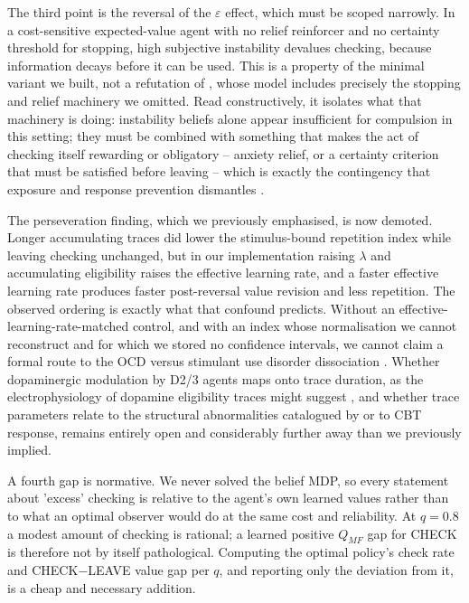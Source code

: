 \documentclass[11pt,a4paper]{article}
\begin{document}
The third point is the reversal of the $\varepsilon$ effect, which must be scoped narrowly. In a cost-sensitive expected-value agent with no relief reinforcer and no certainty threshold for stopping, high subjective instability devalues checking, because information decays before it can be used. This is a property of the minimal variant we built, not a refutation of \citet{fradkin2020searching}, whose model includes precisely the stopping and relief machinery we omitted. Read constructively, it isolates what that machinery is doing: instability beliefs alone appear insufficient for compulsion in this setting; they must be combined with something that makes the act of checking itself rewarding or obligatory -- anxiety relief, or a certainty criterion that must be satisfied before leaving -- which is exactly the contingency that exposure and response prevention dismantles \citep{clark2003cognitivebehavioral}.

The perseveration finding, which we previously emphasised, is now demoted. Longer accumulating traces did lower the stimulus-bound repetition index while leaving checking unchanged, but in our implementation raising $\lambda$ and accumulating eligibility raises the effective learning rate, and a faster effective learning rate produces faster post-reversal value revision and less repetition. The observed ordering is exactly what that confound predicts. Without an effective-learning-rate-matched control, and with an index whose normalisation we cannot reconstruct and for which we stored no confidence intervals, we cannot claim a formal route to the OCD versus stimulant use disorder dissociation \citep{kanen2019computational}. Whether dopaminergic modulation by D2/3 agents maps onto trace duration, as the electrophysiology of dopamine eligibility traces might suggest \citep{pan2005dopamine}, and whether trace parameters relate to the structural abnormalities catalogued by \citet{radua2009voxelwise} or to CBT response, remains entirely open and considerably further away than we previously implied.

A fourth gap is normative. We never solved the belief MDP, so every statement about 'excess' checking is relative to the agent's own learned values rather than to what an optimal observer would do at the same cost and reliability. At $q=0.8$ a modest amount of checking is rational; a learned positive $Q_{MF}$ gap for CHECK is therefore not by itself pathological. Computing the optimal policy's check rate and CHECK$-$LEAVE value gap per $q$, and reporting only the deviation from it, is a cheap and necessary addition.
\end{document}

